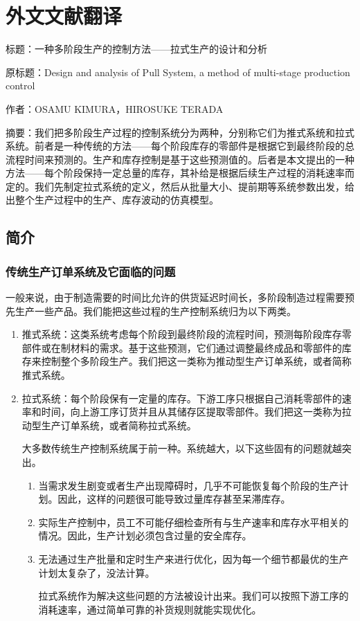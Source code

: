 
\chapter{外文文献翻译}

标题：一种多阶段生产的控制方法——拉式生产的设计和分析

原标题：Design and analysis of Pull System, a method of multi-stage production control

作者：OSAMU KIMURA，HIROSUKE TERADA

摘要：我们把多阶段生产过程的控制系统分为两种，分别称它们为推式系统和拉式系统。前者是一种传统的方法——每个阶段库存的零部件是根据它到最终阶段的总流程时间来预测的。生产和库存控制是基于这些预测值的。后者是本文提出的一种方法——每个阶段保持一定总量的库存，其补给是根据后续生产过程的消耗速率而定的。我们先制定拉式系统的定义，然后从批量大小、提前期等系统参数出发，给出整个生产过程中的生产、库存波动的仿真模型。

\section{简介}

\subsection{传统生产订单系统及它面临的问题}

一般来说，由于制造需要的时间比允许的供货延迟时间长，多阶段制造过程需要预先生产一些产品。我们能把这些过程的生产控制系统归为以下两类。

\begin{enumerate}
\item
推式系统：这类系统考虑每个阶段到最终阶段的流程时间，预测每阶段库存零部件或在制材料的需求。基于这些预测，它们通过调整最终成品和零部件的库存来控制整个多阶段生产。我们把这一类称为推动型生产订单系统，或者简称推式系统。
\item
拉式系统：每个阶段保有一定量的库存。下游工序只根据自己消耗零部件的速率和时间，向上游工序订货并且从其储存区提取零部件。我们把这一类称为拉动型生产订单系统，或者简称拉式系统。

大多数传统生产控制系统属于前一种。系统越大，以下这些固有的问题就越突出。
\begin{enumerate}
\item
当需求发生剧变或者生产出现障碍时，几乎不可能恢复每个阶段的生产计划。因此，这样的问题很可能导致过量库存甚至呆滞库存。
\item
实际生产控制中，员工不可能仔细检查所有与生产速率和库存水平相关的情况。因此，生产计划必须包含过量的安全库存。
\item
无法通过生产批量和定时生产来进行优化，因为每一个细节都最优的生产计划太复杂了，没法计算。

拉式系统作为解决这些问题的方法被设计出来。我们可以按照下游工序的消耗速率，通过简单可靠的补货规则就能实现优化。

\end{enumerate}
\end{enumerate}

